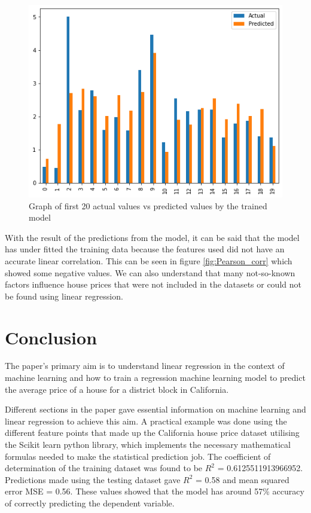 \documentclass[conference]{IEEEtran}
\begin{document}
\begin{figure}[htbp]
	\centerline{\includegraphics [scale=0.5]{figures/actual_vs_predicted.png}}
	\caption{Graph of first 20 actual values vs predicted values by the trained model}
	\label{fig:actual_vs_predicted}
\end{figure}

With the result of the predictions from the model, it can be said that the model has under fitted the training data because the features used did not have an accurate linear correlation. This can be seen in figure \ref{fig:Pearson_corr} which showed some negative values. We can also understand that many not-so-known factors influence house prices that were not included in the datasets or could not be found using linear regression.


\section{Conclusion}
The paper's primary aim is to understand linear regression in the context of machine learning and how to train a regression machine learning model to predict the average price of a house for a district block in California.

Different sections in the paper gave essential information on machine learning and linear regression to achieve this aim. A practical example was done using the different feature points that made up the California house price dataset utilising the Scikit learn python library, which implements the necessary mathematical formulas needed to make the statistical prediction job. The coefficient of determination of the training dataset was found to be $R^2$ = 0.6125511913966952. Predictions made using the testing dataset gave $R^2$ = 0.58 and mean squared error MSE = 0.56. These values showed that the model has around 57\% accuracy of correctly predicting the dependent variable.
\end{document}

